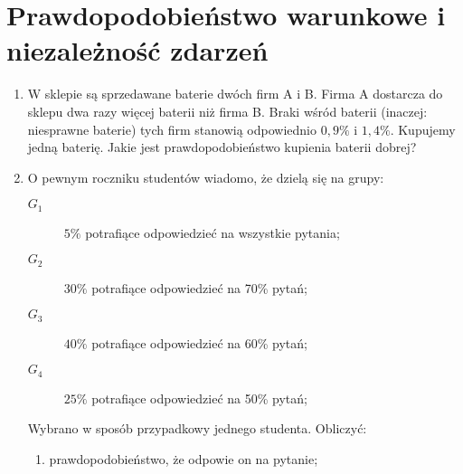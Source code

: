 \documentclass[twoside]{mwart}
\newcommand{\ans}[1]{}
\newcommand{\ans}[1]{\par\emph{Odpowiedź:} #1}
\begin{document}
\section{Prawdopodobieństwo warunkowe i niezależność zdarzeń}
\begin{enumerate}
\item W sklepie są sprzedawane baterie dwóch firm A i B. Firma A dostarcza do sklepu dwa razy więcej baterii niż firma B. Braki wśród baterii (inaczej: niesprawne baterie) tych firm stanowią odpowiednio $0{,}9\%$ i $1{,}4\%$. Kupujemy jedną baterię. Jakie jest prawdopodobieństwo kupienia baterii dobrej?
\ans{
	Definiujemy zdarzenia:
	\begin{itemize}
		\item $A$ bateria pochodzi z firmy A
		\item $B$ bateria pochodzi z firmy B
		\item $D$ bateria jest dobra
		\item $Z$ bateria jest niesprawna
	\end{itemize}
	Z treści zadania budujemy układ równań:
	\[\begin{cases}
	P(A)=2P(B) \\
	P(A)+P(B)=1
	\end{cases} \]
	I obliczamy prawdopodobieństwa: \[P(A)=\frac{2}{3}\qquad P(B)=\frac{1}{3}\]
	Odczytujemy prawdopodobieństwa warunkowe:
	\[ P(Z|A)=0{,}9\% \qquad P(Z|B)=1{,}4\% \]
	Zauważamy, że $A$ i $B$ stanowią podział przestrzeni: oba są możliwe, sumują się do całej przestrzeni i są rozłączne. Zatem możemy zastosować twierdzenie o prawdopodobieństwie całkowitym:
	\[ P(Z)=P(Z|A)P(A)+P(Z|B)P(B)=0{,}9\%\cdot\frac{2}{3}+1{,}4\%\cdot\frac{1}{3}=\frac{3,2}{3}\%=\frac{32}{3000} \]
	Zauważamy, że $D=Z'$, a zatem:
	\[P(D)=1-P(Z)=\frac{2968}{3000}\approx 98,93\% \]
}
\item O pewnym roczniku studentów wiadomo, że dzielą się na grupy:
\begin{description}
\item[$G_1$] $5\%$ potrafiące odpowiedzieć na wszystkie pytania;
\item[$G_2$] $30\%$ potrafiące odpowiedzieć na 70\% pytań;
\item[$G_3$] $40\%$ potrafiące odpowiedzieć na 60\% pytań;
\item[$G_4$] $25\%$ potrafiące odpowiedzieć na 50\% pytań;
\end{description}
Wybrano w sposób przypadkowy jednego studenta. Obliczyć:
\begin{enumerate}
\item prawdopodobieństwo, że odpowie on na pytanie;

\end{enumerate}
\end{enumerate}
\end{document}
